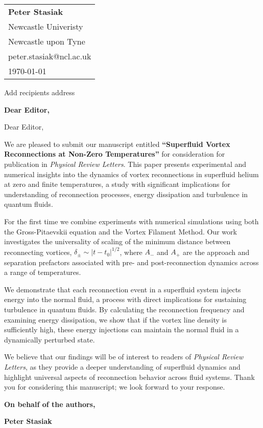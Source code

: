 \documentclass[a4paper,10pt]{letter}
\begin{document}
\begin{flushright}
    \begin{tabular}{l}
        \textbf{Peter Stasiak} \\
        Newcastle Univeristy \\
        Newcastle  upon Tyne \\
        peter.stasiak@ncl.ac.uk \\
        \today
    \end{tabular}
\end{flushright}

\vspace{1cm}

Add recipients address\\


\vspace{1cm}

\textbf{Dear Editor,}

\vspace{0.5cm}

Dear Editor,

We are pleased to submit our manuscript entitled \textbf{``Superfluid Vortex Reconnections at Non-Zero Temperatures''} for consideration for publication in \textit{Physical Review Letters}. This paper presents experimental and numerical insights into the dynamics of vortex reconnections in superfluid helium at zero and finite temperatures, a study with significant implications for understanding of reconnection processes, energy dissipation and turbulence in quantum fluids.

For the first time we combine experiments with numerical simulations using both the Gross-Pitaevskii equation and the Vortex Filament Method. Our work investigates the universality of scaling of the minimum distance between reconnecting vortices, $\delta_{\pm} \sim |t - t_0|^{1/2}$, where $A_{-}$ and $A_{+}$ are the approach and separation prefactors associated with pre- and post-reconnection dynamics across a range of temperatures. 

We demonstrate that each reconnection event in a superfluid system injects energy into the normal fluid, a process with direct implications for sustaining turbulence in quantum fluids. By calculating the reconnection frequency and examining energy dissipation, we show that if the vortex line density is sufficiently high, these energy injections can maintain the normal fluid in a dynamically perturbed state.

We believe that our findings will be of interest to readers of \textit{Physical Review Letters}, as they provide a deeper understanding of superfluid dynamics and highlight universal aspects of reconnection behavior across fluid systems. Thank you for considering this manuscript; we look forward to your response.
\vspace{0.5cm}

\textbf{On behalf of the authors,}

\vspace{1cm}

\textbf{Peter Stasiak}
\end{document}
